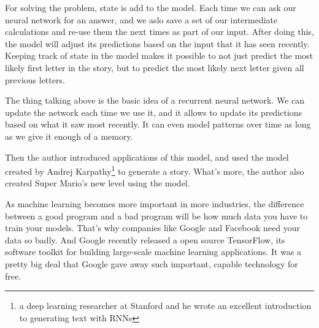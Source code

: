 \documentclass[a4paper,12pt,twocolumn]{article}
\begin{document}
\par
For solving the problem, state is add to the model. Each time we can ask our neural network for an answer, and we aslo save a set of our intermediate calculations and re-use them the next times as part of our input. After doing this, the model will adjust its predictions based on the input that it has seen recently. Keeping track of state in the model makes it possible to not just predict the most likely first letter in the story, but to predict the most likely next letter given all previous letters.
\par
The thing talking above is the basic idea of a recurrent neural network. We can update the network each time we use it, and it allows to update its predictions based on what it saw most recently. It can even model patterns over time as long as we give it enough of a memory.
\par
Then the author introduced applications of this model, and used the model  created by Andrej Karpathy\footnote{a deep learning researcher at Stanford and he wrote an excellent introduction to generating text with RNNs} to generate a story. What's more, the author also created Super Mario's new level using the model.
\par
As machine learning becomes more important in more industries, the difference between a good program and a bad program will be how much data you have to train your models. That's why companies like Google and Facebook need your data so badly. And Google recently released a open source TensorFlow, its software toolkit for building large-scale machine learning applications. It was a pretty big deal that Google gave away such important, capable technology for free. 


\end{document}
